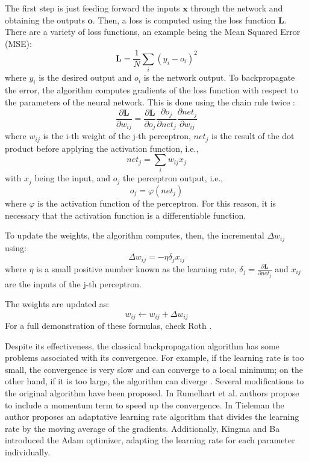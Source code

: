 The first step is just feeding forward the inputs $\mathbf{x}$ through the network and obtaining the outputs $\mathbf{o}$. Then, a loss is computed using the loss function $\mathbf{L}$. There are a variety of loss functions, an example being the Mean Squared Error (MSE):
\begin{equation}
    \mathbf{L} = \frac{1}{N} \sum_{i} \left(y_i-o_i\right)^2
\end{equation}
where $y_i$ is the desired output and $o_i$ is the network output. To backpropagate the error, the algorithm computes gradients of the loss function with respect to the parameters of the neural network. This is done using the chain rule twice \cite{Roth_2016}:
\begin{equation}
    \frac{\partial \mathbf{L}}{\partial w_{ij}} = \frac{\partial \mathbf{L}}{\partial o_j}
    \frac{\partial o_j}{\partial net_j}\frac{\partial net_j}{\partial w_{ij}}
\end{equation}
where $w_{ij}$ is the i-th weight of the j-th perceptron, $net_j$ is the result of the dot product before applying the activation function, i.e.,
\begin{equation}
    net_j = \sum_i w_{ij} x_j
\end{equation}
with $x_j$ being the input, and $o_j$ the perceptron output, i.e.,
\begin{equation}
    o_j = \varphi (net_j)    
\end{equation}
where $\varphi$ is the activation function of the perceptron. For this reason, it is necessary that the activation function is a differentiable function. 

To update the weights, the algorithm computes, then, the incremental $\Delta w_{ij}$ using:
\begin{equation}
    \Delta w_{ij} = -\eta \delta_j x_{ij}
\end{equation}
where $\eta$ is a small positive number known as the learning rate, $\delta_j = \frac{\partial \mathbf{L}}{\partial net_j}$ and $x_{ij}$ are the inputs of the j-th perceptron. 

The weights are updated as:
\begin{equation}
    w_{ij} \xleftarrow{} w_{ij} + \Delta w_{ij}
\end{equation}
For a full demonstration of these formulas, check Roth \cite{Roth_2016}. 

Despite its effectiveness, the classical backpropagation algorithm has some problems associated with its convergence. For example, if the learning rate is too small, the convergence is very slow and can converge to a local minimum; on the other hand, if it is too large, the algorithm can diverge \cite{ruder2016overview}. Several modifications to the original algorithm have been proposed. In Rumelhart et al. \cite{Rumelhart_Hinton_Williams_1986} authors propose to include a momentum term to speed up the convergence. In Tieleman \cite{1370017282431050757} the author proposes an adaptative learning rate algorithm that divides the learning rate by the moving average of the gradients. Additionally, Kingma and Ba \cite{kingma2017adammethodstochasticoptimization} introduced the Adam optimizer, adapting the learning rate for each parameter individually.

